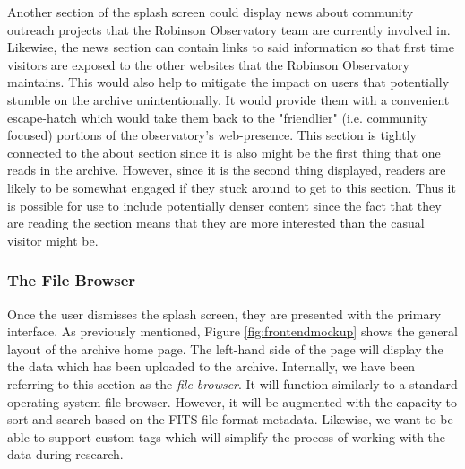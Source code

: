 \documentclass[12pt]{report}
\begin{document}
Another section of the splash screen could display news about community outreach projects that the Robinson Observatory team are currently involved in. Likewise, the news section can contain links to said information so that first time visitors are exposed to the other websites that the Robinson Observatory maintains. This would also help to mitigate the impact on users that potentially stumble on the archive unintentionally. It would provide them with a convenient escape-hatch which would take them back to the "friendlier" (i.e. community focused) portions of the observatory's web-presence. This section is tightly connected to the about section since it is also might be the first thing that one reads in the archive. However, since it is the second thing displayed, readers are likely to be somewhat engaged if they stuck around to get to this section. Thus it is possible for use to include potentially denser content since the fact that they are reading the section means that they are more interested than the casual visitor might be.

\subsubsection*{The File Browser}

Once the user dismisses the splash screen, they are presented with the primary interface. As previously mentioned, Figure \ref{fig:frontendmockup} shows the general layout of the archive home page. The left-hand side of the page will display the the data which has been uploaded to the archive. Internally, we have been referring to this section as the \textit{file browser}. It will function similarly to a standard operating system file browser. However, it will be augmented with the capacity to sort and search based on the FITS file format metadata. Likewise, we want to be able to support custom tags which will simplify the process of working with the data during research.
\end{document}
